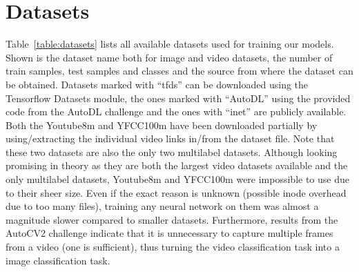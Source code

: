 \documentclass{article}
\begin{document}
\section{Datasets}
\label{sec:datasets}
Table~\ref{table:datasets} lists all available datasets used for training our models. Shown is the dataset name both for image and video datasets, the number of train samples, test samples and classes and the source from where the dataset can be obtained. Datasets marked with ``tfds'' can be downloaded using the Tensorflow Datasets module, the ones marked with ``AutoDL'' using the provided code from the AutoDL challenge and the ones with ``inet'' are publicly available. Both the Youtube8m and YFCC100m have been downloaded partially by using/extracting the individual video links in/from the dataset file. Note that these two datasets are also the only two multilabel datasets.
Although looking promising in theory as they are both the largest video datasets available and the only multilabel datasets, Youtube8m and YFCC100m were impossible to use due to their sheer size. Even if the exact reason is unknown (possible inode overhead due to too many files), training any neural network on them was almost a magnitude slower compared to smaller datasets.
Furthermore, results from the AutoCV2 challenge indicate that it is unnecessary to capture multiple frames from a video (one is sufficient), thus turning the video classification task into a image classification task.
\end{document}
